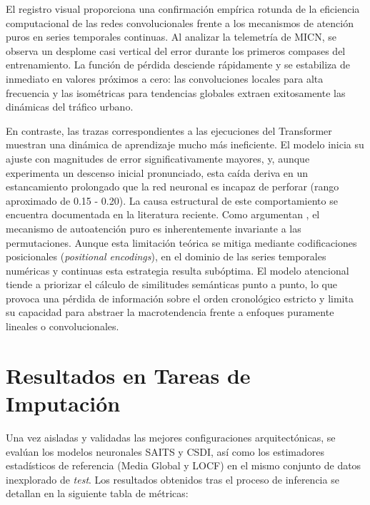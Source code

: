 El registro visual proporciona una confirmación empírica rotunda de la eficiencia computacional de las redes convolucionales frente a los mecanismos de atención puros en series temporales continuas. Al analizar la telemetría de MICN, se observa un desplome casi vertical del error durante los primeros compases del entrenamiento. La función de pérdida desciende rápidamente y se estabiliza de inmediato en valores próximos a cero: las convoluciones locales para alta frecuencia y las isométricas para tendencias globales extraen exitosamente las dinámicas del tráfico urbano.

En contraste, las trazas correspondientes a las ejecuciones del Transformer muestran una dinámica de aprendizaje mucho más ineficiente. El modelo inicia su ajuste con magnitudes de error significativamente mayores, y, aunque experimenta un descenso inicial pronunciado, esta caída deriva en un estancamiento prolongado que la red neuronal es incapaz de perforar (rango aproximado de 0.15 - 0.20). La causa estructural de este comportamiento se encuentra documentada en la literatura reciente. Como argumentan \textcite{zeng2023are}, el mecanismo de autoatención puro es inherentemente invariante a las permutaciones. Aunque esta limitación teórica se mitiga mediante codificaciones posicionales (\textit{positional encodings}), en el dominio de las series temporales numéricas y continuas esta estrategia resulta subóptima. El modelo atencional tiende a priorizar el cálculo de similitudes semánticas punto a punto, lo que provoca una pérdida de información sobre el orden cronológico estricto y limita su capacidad para abstraer la macrotendencia frente a enfoques puramente lineales o convolucionales.





\section{Resultados en Tareas de Imputación}
\label{sec:results_imputation}

Una vez aisladas y validadas las mejores configuraciones arquitectónicas, se evalúan los modelos neuronales SAITS y CSDI, así como los estimadores estadísticos de referencia (Media Global y LOCF) en el mismo conjunto de datos inexplorado de \textit{test}. Los resultados obtenidos tras el proceso de inferencia se detallan en la siguiente tabla de métricas:

